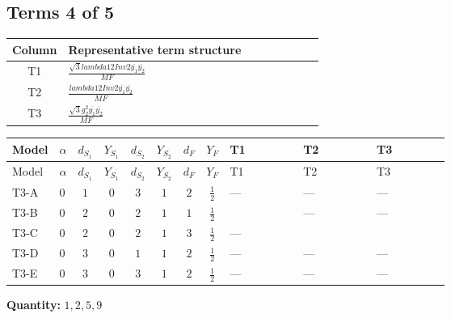 \documentclass[8pt]{article}
\begin{document}
\begin{landscape}
\subsection*{Terms 4 of 5}
\begin{center}
\begin{tabular}{@{}c >{\raggedright\arraybackslash}p{0.82\linewidth}@{}}
\toprule
Column & Representative term structure \\
\midrule
T1 & \(\displaystyle \frac{\sqrt{3} lambda12Inv2 \overline{y_{1}} \overline{y_{2}}}{MF}\) \\
\midrule
T2 & \(\displaystyle \frac{lambda12Inv2 \overline{y_{1}} \overline{y_{2}}}{MF}\) \\
\midrule
T3 & \(\displaystyle \frac{\sqrt{3} g_{2}^{2} \overline{y_{1}} \overline{y_{2}}}{MF}\) \\
\midrule
\bottomrule
\end{tabular}
\end{center}
\smallskip
\tiny
\begin{longtable}{@{}llcccccc >{\raggedright\arraybackslash}p{0.21\linewidth} >{\raggedright\arraybackslash}p{0.21\linewidth} >{\raggedright\arraybackslash}p{0.21\linewidth}@{}}
\toprule
Model & $\alpha$ & $d_{S_1}$ & $Y_{S_1}$ & $d_{S_2}$ & $Y_{S_2}$ & $d_F$ & $Y_F$ & T1 & T2 & T3 \\
\midrule
\endfirsthead
\toprule
Model & $\alpha$ & $d_{S_1}$ & $Y_{S_1}$ & $d_{S_2}$ & $Y_{S_2}$ & $d_F$ & $Y_F$ & T1 & T2 & T3 \\
\midrule
\endhead
T3-A & $0$ & $1$ & $0$ & $3$ & $1$ & $2$ & $\frac{1}{2}$ & --- & --- & --- \\
\midrule
T3-B & $0$ & $2$ & $0$ & $2$ & $1$ & $1$ & $\frac{1}{2}$ & \scriptsize\adjustbox{max width=\linewidth}{$\begin{gathered} \frac{\sqrt{3} lambda12Inv2 \overline{y_{1}} \overline{y_{2}}}{6 MF}\end{gathered}$} & --- & --- \\
\midrule
T3-C & $0$ & $2$ & $0$ & $2$ & $1$ & $3$ & $\frac{1}{2}$ & --- & \scriptsize\adjustbox{max width=\linewidth}{$\begin{gathered} - \frac{lambda12Inv2 \overline{y_{1}} \overline{y_{2}}}{6 MF}\end{gathered}$} & \scriptsize\adjustbox{max width=\linewidth}{$\begin{gathered} - \frac{\sqrt{3} g_{2}^{2} \overline{y_{1}} \overline{y_{2}}}{8 MF}\end{gathered}$} \\
\midrule
T3-D & $0$ & $3$ & $0$ & $1$ & $1$ & $2$ & $\frac{1}{2}$ & --- & --- & --- \\
\midrule
T3-E & $0$ & $3$ & $0$ & $3$ & $1$ & $2$ & $\frac{1}{2}$ & --- & --- & --- \\
\midrule
\bottomrule
\end{longtable}
\clearpage
\noindent\textbf{Quantity: }$\mathrm{1,2,5,9}$\par\smallskip

\end{landscape}
\end{document}
